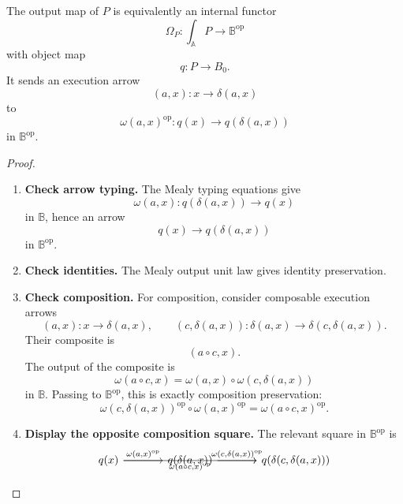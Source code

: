 \begin{proposition}
\label{prop:output-functor}
    The output map of \(P\) is equivalently an internal functor
    \[
        \Omega_P:\int_{\mathbb A}P\to\mathbb B^{\mathrm{op}}
    \]
    with object map
    \[
        q:P\to B_0.
    \]
    It sends an execution arrow
    \[
        (a,x):x\to\delta(a,x)
    \]
    to
    \[
        \omega(a,x)^{\mathrm{op}}:q(x)\to q(\delta(a,x))
    \]
    in \(\mathbb B^{\mathrm{op}}\).
\end{proposition}
\begin{proof}
    \leavevmode
    \begin{enumerate}
        \item \textbf{Check arrow typing.} The Mealy typing equations give
        \[
            \omega(a,x):q(\delta(a,x))\to q(x)
        \]
        in \(\mathbb B\), hence an arrow
        \[
            q(x)\to q(\delta(a,x))
        \]
        in \(\mathbb B^{\mathrm{op}}\).

        \item \textbf{Check identities.} The Mealy output unit law gives identity preservation.

        \item \textbf{Check composition.} For composition, consider composable execution arrows
        \[
            (a,x):x\to\delta(a,x),
            \qquad
            (c,\delta(a,x)):\delta(a,x)\to\delta(c,\delta(a,x)).
        \]
        Their composite is
        \[
            (a\circ c,x).
        \]
        The output of the composite is
        \[
            \omega(a\circ c,x)
            =
            \omega(a,x)\circ\omega(c,\delta(a,x))
        \]
        in \(\mathbb B\). Passing to \(\mathbb B^{\mathrm{op}}\), this is exactly composition preservation:
        \[
            \omega(c,\delta(a,x))^{\mathrm{op}}
            \circ
            \omega(a,x)^{\mathrm{op}}
            =
            \omega(a\circ c,x)^{\mathrm{op}}.
        \]

        \item \textbf{Display the opposite composition square.} The relevant square in \(\mathbb B^{\mathrm{op}}\) is
        \[
            \begin{tikzcd}[column sep=large, row sep=large]
                    {q(x)}
                        \arrow{r}{\omega(a,x)^{\mathrm{op}}}
                        \arrow{rr}[swap, bend right=15]{\omega(a\circ c,x)^{\mathrm{op}}}
                &
                    {q(\delta(a,x))}
                        \arrow{r}{\omega(c,\delta(a,x))^{\mathrm{op}}}
                &
                    {q(\delta(c,\delta(a,x)))}
            \end{tikzcd}
        \]
    \end{enumerate}
\end{proof}

